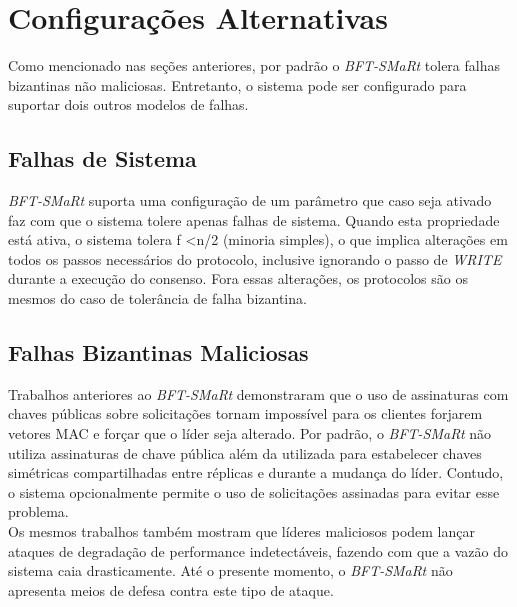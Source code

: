 	 \section{Configurações Alternativas}
	 
	 Como mencionado nas seções anteriores, por padrão o \textit{BFT-SMaRt} tolera falhas bizantinas não maliciosas. Entretanto, o sistema pode ser configurado para suportar dois outros modelos de falhas.\\
	 
	 	\subsection{Falhas de Sistema}
	 	\textit{BFT-SMaRt} suporta uma configuração de um parâmetro que caso seja ativado faz com que o sistema tolere apenas falhas de sistema. Quando esta propriedade está ativa, o sistema tolera  f \textless  n/2 (minoria simples), o que implica alterações em todos os passos necessários do protocolo, inclusive ignorando o passo de \textit{WRITE} durante a execução do consenso. Fora essas alterações, os protocolos são os mesmos do caso de tolerância de falha bizantina. 
	 	
	 	\subsection{Falhas Bizantinas Maliciosas}
	 	Trabalhos anteriores ao \textit{BFT-SMaRt} demonstraram que o uso de assinaturas com chaves públicas sobre solicitações tornam impossível para os clientes forjarem vetores MAC e forçar que o líder seja alterado. Por padrão, o \textit{BFT-SMaRt} não utiliza assinaturas de chave pública além da utilizada para estabelecer chaves simétricas compartilhadas entre réplicas e durante a mudança do líder. Contudo, o sistema opcionalmente permite o uso de solicitações assinadas para evitar esse problema.\\
	 	
	 	Os mesmos trabalhos também mostram que líderes maliciosos podem lançar ataques de degradação de performance indetectáveis, fazendo com que a vazão do sistema caia drasticamente. Até o presente momento, o \textit{BFT-SMaRt} não apresenta meios de defesa contra este tipo de ataque. \\
	 	

